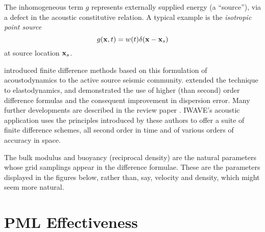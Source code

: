The inhomogeneous term $g$ represents externally supplied energy (a
``source''), via a defect in the acoustic constitutive relation. A
typical example is the {\em isotropic point source}
\[
g({\bf x},t) = w(t) \delta({\bf x}-{\bf x}_s)
\]
at source location ${\bf x}_s$.

\cite{Vir:84} introduced finite difference methods based on this
formulation of acoustodynamics to the active source seismic
community. \cite{Vir:86} extended the technique to elastodynamics, and
\cite{Lev:88} demonstrated the use of higher (than second) order
difference formulas and the consequent improvement in dispersion
error. Many further developments are described in the review paper
\cite{moczoetal:06}. IWAVE's acoustic application uses the principles introduced by
these authors to offer a suite of finite difference schemes, all
second order in time and of various orders of accuracy in space.

The bulk modulus and buoyancy (reciprocal density) are the natural
parameters whose grid samplings appear in the difference
formulae. These are the parameters displayed in the figures below,
rather than, say, velocity and density, which might seem more natural.

\section{PML Effectiveness}

